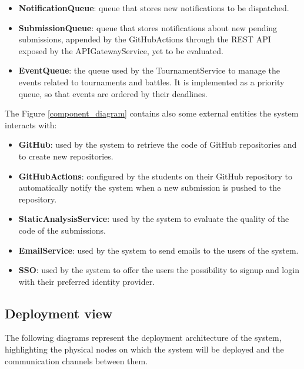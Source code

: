 \begin{itemize}
    \item \textbf{NotificationQueue}: queue that stores new notifications to be dispatched.
    \item \textbf{SubmissionQueue}: queue that stores notifications about new pending submissions, appended by the GitHubActions through the REST API exposed by the APIGatewayService, yet to be evaluated.
    \item \textbf{EventQueue}: the queue used by the TournamentService to manage the events related to tournaments and battles. It is implemented as a priority queue, so that events are ordered by their deadlines.
\end{itemize}
The Figure \ref{component_diagram} contains also some external entities the system interacts with:
\begin{itemize}
    \item \textbf{GitHub}: used by the system to retrieve the code of GitHub repositories and to create new repositories.
    \item \textbf{GitHubActions}: configured by the students on their GitHub repository to automatically notify the system when a new submission is pushed to the repository.
    \item \textbf{StaticAnalysisService}: used by the system to evaluate the quality of the code of the submissions.
    \item \textbf{EmailService}: used by the system to send emails to the users of the system.
    \item \textbf{SSO}: used by the system to offer the users the possibility to signup and login with their preferred identity provider.
\end{itemize}

\newpage
\subsection{Deployment view}
The following diagrams represent the deployment architecture of the system, highlighting the physical nodes on which the system will be deployed and the communication channels between them.

